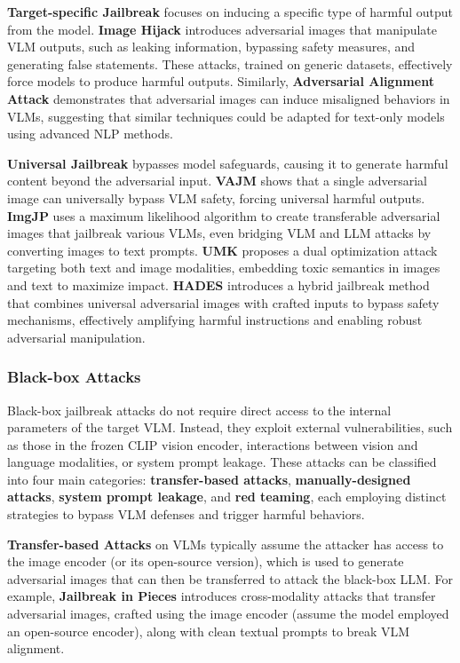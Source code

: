 \textbf{Target-specific Jailbreak} focuses on inducing a specific type of harmful output from the model.
\textbf{Image Hijack} \cite{bailey2023image} introduces adversarial images that manipulate VLM outputs, such as leaking information, bypassing safety measures, and generating false statements. These attacks, trained on generic datasets, effectively force models to produce harmful outputs.
Similarly, \textbf{Adversarial Alignment Attack} \cite{carlini2024aligned} demonstrates that adversarial images can induce misaligned behaviors in VLMs, suggesting that similar techniques could be adapted for text-only models using advanced NLP methods.

\textbf{Universal Jailbreak} bypasses model safeguards, causing it to generate harmful content beyond the adversarial input.
\textbf{VAJM} \cite{qi2024visual} shows that a single adversarial image can universally bypass VLM safety, forcing universal harmful outputs. \textbf{ImgJP} \cite{niu2024jailbreaking} uses a maximum likelihood algorithm to create transferable adversarial images that jailbreak various VLMs, even bridging VLM and LLM attacks by converting images to text prompts. \textbf{UMK} \cite{wang2024white} proposes a dual optimization attack targeting both text and image modalities, embedding toxic semantics in images and text to maximize impact. \textbf{HADES} \cite{li2024images} introduces a hybrid jailbreak method that combines universal adversarial images with crafted inputs to bypass safety mechanisms, effectively amplifying harmful instructions and enabling robust adversarial manipulation.



\subsubsection{Black-box Attacks}

Black-box jailbreak attacks do not require direct access to the internal parameters of the target VLM. Instead, they exploit external vulnerabilities, such as those in the frozen CLIP vision encoder, interactions between vision and language modalities, or system prompt leakage. These attacks can be classified into four main categories: \textbf{transfer-based attacks}, \textbf{manually-designed attacks}, \textbf{system prompt leakage}, and \textbf{red teaming}, each employing distinct strategies to bypass VLM defenses and trigger harmful behaviors.

\textbf{Transfer-based Attacks} on VLMs typically assume the attacker has access to the image encoder (or its open-source version), which is used to generate adversarial images that can then be transferred to attack the black-box LLM. For example, \textbf{Jailbreak in Pieces} \cite{shayegani2023jailbreak} introduces cross-modality attacks that transfer adversarial images, crafted using the image encoder (assume the model employed an open-source encoder), along with clean textual prompts to break VLM alignment. 

